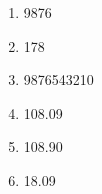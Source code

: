 %
%
    \begin{enumerate}
        \item \num{9876}
        \item 178
        \item \num{9876543210}
        \item \num{108,09}
        \item \num{108,90}
        \item \num{18,09}
    \end{enumerate}
